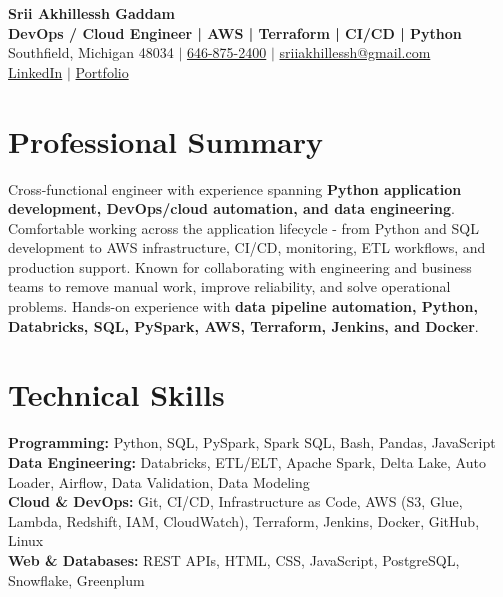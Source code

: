 \documentclass[letterpaper,10pt]{article}
\begin{document}
\fontsize{9.35pt}{10.45pt}\selectfont

\begin{center}
    {\LARGE \textbf{Srii Akhillessh Gaddam}} \\[-1pt]
    \textbf{DevOps / Cloud Engineer | AWS | Terraform | CI/CD | Python} \\[2pt]
    Southfield, Michigan 48034 $|$
    \href{tel:6468752400}{646-875-2400} $|$
    \href{mailto:sriiakhillessh@gmail.com}{sriiakhillessh@gmail.com} \\[1pt]
    \href{https://www.linkedin.com/in/srii-akhiilessh-gaddam-b48668191/}{LinkedIn} $|$
    \href{https://sriiakhillesshg.github.io/portfolio/}{Portfolio}
\end{center}
\vspace{-8pt}

\section{Professional Summary}
\small{Cross-functional engineer with experience spanning \textbf{Python application development, DevOps/cloud automation, and data engineering}. Comfortable working across the application lifecycle - from Python and SQL development to AWS infrastructure, CI/CD, monitoring, ETL workflows, and production support. Known for collaborating with engineering and business teams to remove manual work, improve reliability, and solve operational problems. Hands-on experience with \textbf{data pipeline automation, Python, Databricks, SQL, PySpark, AWS, Terraform, Jenkins, and Docker}.}

\section{Technical Skills}
\small{
\textbf{Programming:} Python, SQL, PySpark, Spark SQL, Bash, Pandas, JavaScript \\
\textbf{Data Engineering:} Databricks, ETL/ELT, Apache Spark, Delta Lake, Auto Loader, Airflow, Data Validation, Data Modeling \\
\textbf{Cloud \& DevOps:} Git, CI/CD, Infrastructure as Code, AWS (S3, Glue, Lambda, Redshift, IAM, CloudWatch), Terraform, Jenkins, Docker, GitHub, Linux \\
\textbf{Web \& Databases:} REST APIs, HTML, CSS, JavaScript, PostgreSQL, Snowflake, Greenplum
}
\end{document}
